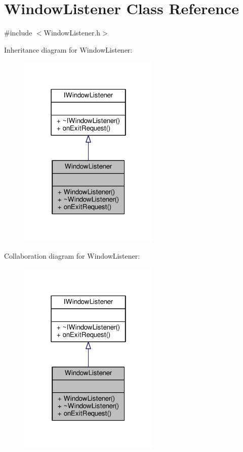 \hypertarget{class_window_listener}{\section{Window\-Listener Class Reference}
\label{class_window_listener}
}


{\ttfamily \#include $<$Window\-Listener.\-h$>$}



Inheritance diagram for Window\-Listener\-:\nopagebreak
\begin{figure}[H]
\begin{center}
\leavevmode
\includegraphics[width=190pt]{class_window_listener__inherit__graph}
\end{center}
\end{figure}


Collaboration diagram for Window\-Listener\-:
\nopagebreak
\begin{figure}[H]
\begin{center}
\leavevmode
\includegraphics[width=190pt]{class_window_listener__coll__graph}
\end{center}
\end{figure}
